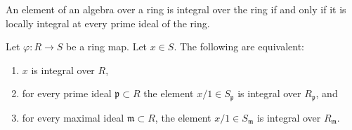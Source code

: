 \begin{lemma}
\label{lemma-integral-closure-stalks}
\begin{slogan}
An element of an algebra over a ring is integral over the ring
if and only if it is locally integral at every prime ideal of the ring.
\end{slogan}
Let $\varphi : R \to S$ be a ring map.
Let $x \in S$. The following are equivalent:
\begin{enumerate}
\item $x$ is integral over $R$,
\item for every prime ideal $\mathfrak p \subset R$ the element
$x/1\in S_{\mathfrak p}$ is integral over $R_{\mathfrak p}$, and
\item for every maximal ideal $\mathfrak m\subset R$, the element
$x/1\in S_{\mathfrak m}$ is integral over $R_{\mathfrak m}$.
\end{enumerate}
\end{lemma}

